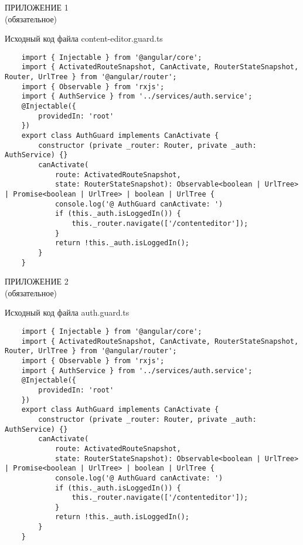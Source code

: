 {}
\begin{center}
    ПРИЛОЖЕНИЕ 1\\
    (обязательное)


    Исходный код файла content-editor.guard.ts
\end{center}

\begin{lstlisting}
    import { Injectable } from '@angular/core';
    import { ActivatedRouteSnapshot, CanActivate, RouterStateSnapshot, Router, UrlTree } from '@angular/router';
    import { Observable } from 'rxjs';
    import { AuthService } from '../services/auth.service';
    @Injectable({
        providedIn: 'root'
    })
    export class AuthGuard implements CanActivate {
        constructor (private _router: Router, private _auth: AuthService) {}
        canActivate(
            route: ActivatedRouteSnapshot,
            state: RouterStateSnapshot): Observable<boolean | UrlTree> | Promise<boolean | UrlTree> | boolean | UrlTree {
            console.log('@ AuthGuard canActivate: ')
            if (this._auth.isLoggedIn()) {
                this._router.navigate(['/contenteditor']);
            }
            return !this._auth.isLoggedIn();
        }
    }
\end{lstlisting}
\clearpage

{}\label{на-приложение-2}
\begin{center}
    ПРИЛОЖЕНИЕ 2\\
    (обязательное)


    Исходный код файла auth.guard.ts
\end{center}

\begin{lstlisting}
    import { Injectable } from '@angular/core';
    import { ActivatedRouteSnapshot, CanActivate, RouterStateSnapshot, Router, UrlTree } from '@angular/router';
    import { Observable } from 'rxjs';
    import { AuthService } from '../services/auth.service';
    @Injectable({
        providedIn: 'root'
    })
    export class AuthGuard implements CanActivate {
        constructor (private _router: Router, private _auth: AuthService) {}
        canActivate(
            route: ActivatedRouteSnapshot,
            state: RouterStateSnapshot): Observable<boolean | UrlTree> | Promise<boolean | UrlTree> | boolean | UrlTree {
            console.log('@ AuthGuard canActivate: ')
            if (this._auth.isLoggedIn()) {
                this._router.navigate(['/contenteditor']);
            }
            return !this._auth.isLoggedIn();
        }
    }
\end{lstlisting}
\clearpage


